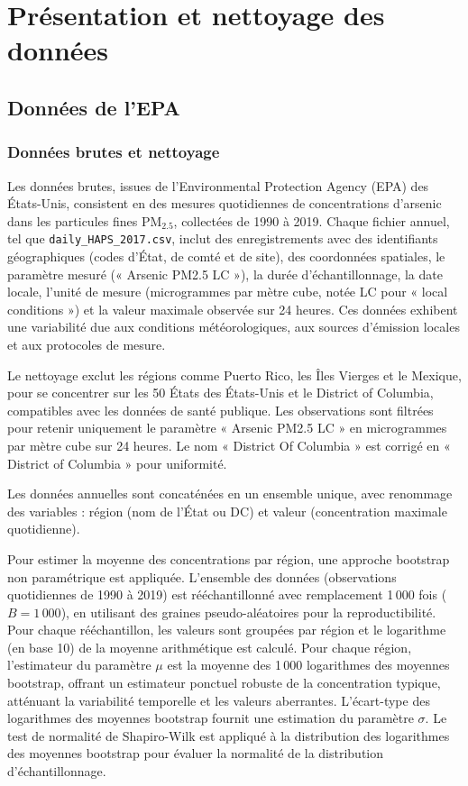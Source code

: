 \chapter{Présentation et nettoyage des données}
\label{chap:data}

\section{Données de l'EPA}

\subsection{Données brutes et nettoyage}

Les données brutes, issues de l'Environmental Protection Agency (EPA) \citep{epa_air_quality_system_2024} des États-Unis, consistent en des mesures quotidiennes de concentrations d'arsenic dans les particules fines PM$_{2.5}$, collectées de 1990 à 2019. Chaque fichier annuel, tel que \texttt{daily\_HAPS\_2017.csv}, inclut des enregistrements avec des identifiants géographiques (codes d'État, de comté et de site), des coordonnées spatiales, le paramètre mesuré (« Arsenic PM2.5 LC »), la durée d'échantillonnage, la date locale, l'unité de mesure (microgrammes par mètre cube, notée LC pour « local conditions ») et la valeur maximale observée sur 24 heures. Ces données exhibent une variabilité due aux conditions météorologiques, aux sources d'émission locales et aux protocoles de mesure.

Le nettoyage exclut les régions comme Puerto Rico, les Îles Vierges et le Mexique, pour se concentrer sur les 50 États des États-Unis et le District of Columbia, compatibles avec les données de santé publique. Les observations sont filtrées pour retenir uniquement le paramètre « Arsenic PM2.5 LC » en microgrammes par mètre cube sur 24 heures. Le nom « District Of Columbia » est corrigé en « District of Columbia » pour uniformité.

Les données annuelles sont concaténées en un ensemble unique, avec renommage des variables : région (nom de l'État ou DC) et valeur (concentration maximale quotidienne).

Pour estimer la moyenne des concentrations par région, une approche bootstrap non paramétrique est appliquée. L'ensemble des données (observations quotidiennes de 1990 à 2019) est rééchantillonné avec remplacement 1\,000 fois ($B = 1\,000$), en utilisant des graines pseudo-aléatoires pour la reproductibilité. Pour chaque rééchantillon, les valeurs sont groupées par région et le logarithme (en base 10) de la moyenne arithmétique est calculé. Pour chaque région, l'estimateur du paramètre $\mu$ est la moyenne des 1\,000 logarithmes des moyennes bootstrap, offrant un estimateur ponctuel robuste de la concentration typique, atténuant la variabilité temporelle et les valeurs aberrantes. L'écart-type des logarithmes des moyennes bootstrap fournit une estimation du paramètre $\sigma$. Le test de normalité de Shapiro-Wilk est appliqué à la distribution des logarithmes des moyennes bootstrap pour évaluer la normalité de la distribution d'échantillonnage.

